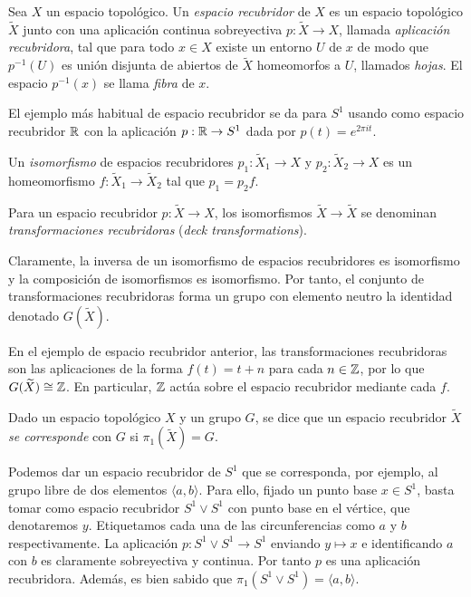 \documentclass[TFG.tex]{subfiles}
\begin{document}
\begin{defi}
Sea $X$ un espacio topológico. Un \emph{espacio recubridor} de $X$ es un espacio topológico $\widetilde{X}$ junto con una aplicación continua sobreyectiva $p:\widetilde{X}\to X$, llamada \emph{aplicación recubridora}, tal que para todo $x\in X$ existe un entorno $U$ de $x$ de modo que $p^{-1}(U)$ es unión disjunta de abiertos de $\widetilde{X}$ homeomorfos a $U$, llamados \emph{hojas}. El espacio $p^{-1}(x)$ se llama \emph{fibra} de $x$.
\end{defi}

\begin{ej}
El ejemplo más habitual de espacio recubridor se da para $S^1$ usando como espacio recubridor $\mathbb{R}$ con la aplicación $p:\mathbb{R}\to S^1$ dada por $p(t)=e^{2\pi i t}$. 
\end{ej}

\begin{defi}
Un \emph{isomorfismo} de espacios recubridores $p_1:\widetilde{X}_1\to X$ y $p_2:\widetilde{X}_2\to X$ es un homeomorfismo $f:\widetilde{X}_1\to\widetilde{X}_2$ tal que $p_1=p_2f$.
\end{defi}

\begin{defi}
Para un espacio recubridor $p:\widetilde{X}\to X$, los isomorfismos $\widetilde{X}\to\widetilde{X}$ se denominan \emph{transformaciones recubridoras} (\emph{deck transformations}). 
\end{defi}

Claramente, la inversa de un isomorfismo de espacios recubridores es isomorfismo y la composición de isomorfismos es isomorfismo. Por tanto, el conjunto de transformaciones recubridoras forma un grupo con elemento neutro la identidad denotado $G(\widetilde{X})$. 

\begin{ej}
En el ejemplo de espacio recubridor anterior, las transformaciones recubridoras son las aplicaciones de la forma $f(t)=t+n$ para cada $n\in\mathbb{Z}$, por lo que $G(\widetilde{X})\cong\mathbb{Z}$. En particular, $\mathbb{Z}$ actúa sobre el espacio recubridor mediante cada $f$. 
\end{ej}

\begin{defi}
Dado un espacio topológico $X$ y un grupo $G$, se dice que un espacio recubridor $\widetilde{X}$ \emph{se corresponde} con $G$ si $\pi_1(\widetilde{X})=G$. 
\end{defi}

\begin{ej}
Podemos dar un espacio recubridor de $S^1$ que se corresponda, por ejemplo, al grupo libre de dos elementos $\langle a, b\rangle$. Para ello, fijado un punto base $x\in S^1$, basta tomar como espacio recubridor $S^1\lor S^1$ con punto base en el vértice, que denotaremos $y$. Etiquetamos cada una de las circunferencias como $a$ y $b$ respectivamente. La aplicación $p:S^1\lor S^1\to S^1$ enviando $y\mapsto x$ e identificando $a$ con $b$ es claramente sobreyectiva y continua. Por tanto $p$ es una aplicación recubridora. Además, es bien sabido que $\pi_1(S^1\lor  S^1)=\langle a, b\rangle$. 
\end{ej}
\end{document}
